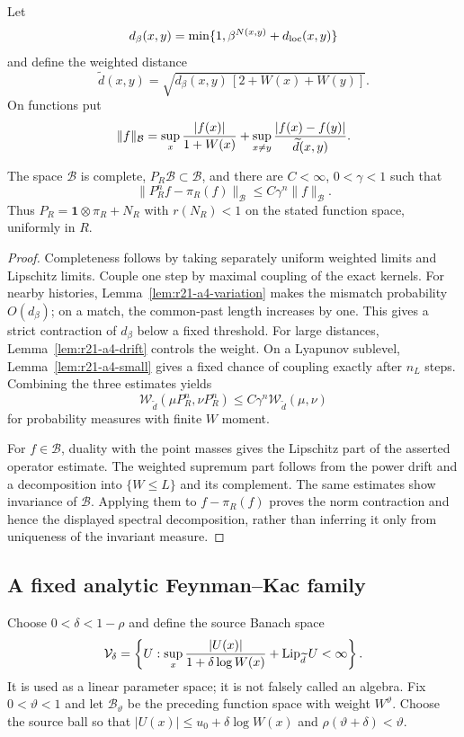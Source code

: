 Let
\[
 d_\beta(x,y)=\min\{1,\beta^{N(x,y)}+d_{\rm loc}(x,y)\}
\]
and define the weighted distance
\[
 \widetilde d(x,y)=
 \sqrt{d_\beta(x,y)\,[2+W(x)+W(y)]}.
\]
On functions put
\[
 \|f\|_{\mathcal B}=\sup_x{|f(x)|\over1+W(x)}+
 \sup_{x\ne y}{|f(x)-f(y)|\over\widetilde d(x,y)}.
\]

\begin{theorem}
\label{thm:r21-a4-harris}
The space $\mathcal B$ is complete, $P_R\mathcal B\subset\mathcal B$, and
there are $C<\infty$, $0<\gamma<1$ such that
\[
 \|P_R^nf-\pi_R(f)\|_{\mathcal B}
 \le C\gamma^n\|f\|_{\mathcal B}.
\]
Thus $P_R=\mathbf1\otimes\pi_R+N_R$ with
$r(N_R)<1$ on the stated function space, uniformly in $R$.
\end{theorem}

\begin{proof}
Completeness follows by taking separately uniform weighted limits and
Lipschitz limits.  Couple one step by maximal coupling of the exact kernels.
For nearby histories, Lemma~\ref{lem:r21-a4-variation} makes the mismatch
probability $O(d_\beta)$; on a match, the common-past length increases by one.
This gives a strict contraction of $d_\beta$ below a fixed threshold.  For
large distances, Lemma~\ref{lem:r21-a4-drift} controls the weight.  On a
Lyapunov sublevel, Lemma~\ref{lem:r21-a4-small} gives a fixed chance of coupling
exactly after $n_L$ steps.  Combining the three estimates yields
\[
 \mathcal W_{\widetilde d}(\mu P_R^n,\nu P_R^n)
 \le C\gamma^n\mathcal W_{\widetilde d}(\mu,\nu)
\]
for probability measures with finite $W$ moment.

For $f\in\mathcal B$, duality with the point masses gives the Lipschitz part of
the asserted operator estimate.  The weighted supremum part follows from the
power drift and a decomposition into $\{W\le L\}$ and its complement.  The
same estimates show invariance of $\mathcal B$.  Applying them to
$f-\pi_R(f)$ proves the norm contraction and hence the displayed spectral
decomposition, rather than inferring it only from uniqueness of the invariant
measure.
\end{proof}

\subsection{A fixed analytic Feynman--Kac family}

Choose $0<\delta<1-\rho$ and define the source Banach space
\[
 \mathcal V_\delta=\left\{U:
 \sup_x{|U(x)|\over1+\delta\log W(x)}+
 \operatorname{Lip}_{\widetilde d}U<\infty\right\}.
\]
It is used as a linear parameter space; it is not falsely called an algebra.
Fix $0<\vartheta<1$ and let $\mathcal B_\vartheta$ be the preceding function
space with weight $W^\vartheta$.  Choose the source ball so that
$|U(x)|\le u_0+\delta\log W(x)$ and
$\rho(\vartheta+\delta)<\vartheta$.

